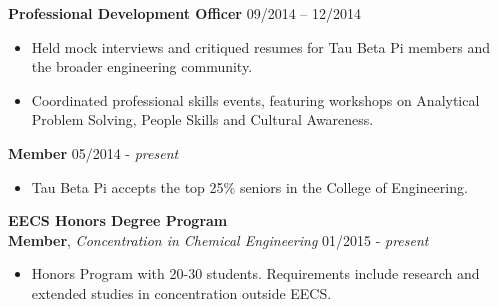 \documentclass{article}
\begin{document}
\noindent
\textbf{Professional Development Officer}
\hfill 09/2014 -- 12/2014
\begin{itemize}
\vspace{-2.5mm}
\item Held mock interviews and critiqued resumes for Tau Beta Pi members and the broader engineering community.
\vspace{-6.5mm}
\item Coordinated professional skills events, featuring workshops on Analytical Problem Solving, People Skills and Cultural Awareness.
\end{itemize}
\vspace{-3.0mm}

\noindent
\textbf{Member}
\hfill 05/2014 - \textit{present}
\begin{itemize}
\vspace{-2.5mm}
\item Tau Beta Pi accepts the top 25\% seniors in the College of Engineering.
\end{itemize}
\vspace{-1.5mm}

\noindent
\textbf{EECS Honors Degree Program} \\
\textbf{Member}, \textit{Concentration in Chemical Engineering}
\hfill 01/2015 - \textit{present}
\begin{itemize}
\vspace{-2.5mm}
\item Honors Program with 20-30 students. Requirements include research and extended studies in concentration outside EECS.
\end{itemize}
\end{document}
